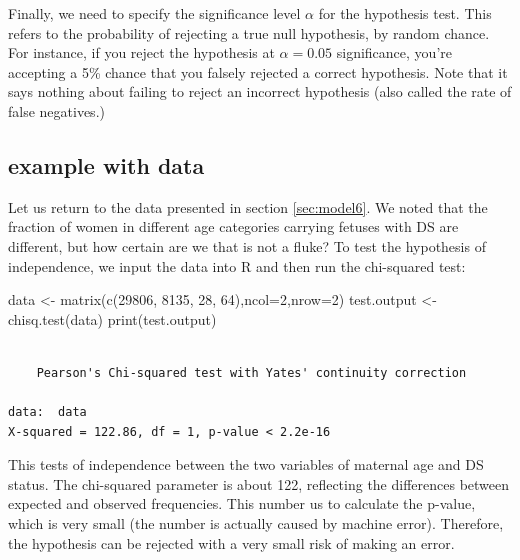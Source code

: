 \documentclass[
  letterpaper,
  DIV=11,
  numbers=noendperiod]{scrreprt}
\newenvironment{Shaded}{\begin{snugshade}}{\end{snugshade}}
\newcommand{\AttributeTok}[1]{\textcolor[rgb]{0.40,0.45,0.13}{#1}}
\newcommand{\DecValTok}[1]{\textcolor[rgb]{0.68,0.00,0.00}{#1}}
\newcommand{\FunctionTok}[1]{\textcolor[rgb]{0.28,0.35,0.67}{#1}}
\newcommand{\NormalTok}[1]{\textcolor[rgb]{0.00,0.23,0.31}{#1}}
\newcommand{\OtherTok}[1]{\textcolor[rgb]{0.00,0.23,0.31}{#1}}
\begin{document}
Finally, we need to specify the significance level \(\alpha\) for the
hypothesis test. This refers to the probability of rejecting a true null
hypothesis, by random chance. For instance, if you reject the hypothesis
at \(\alpha=0.05\) significance, you're accepting a 5\% chance that you
falsely rejected a correct hypothesis. Note that it says nothing about
failing to reject an incorrect hypothesis (also called the rate of false
negatives.)

\hypertarget{example-with-data}{%
\subsection{example with data}\label{example-with-data}}

Let us return to the data presented in section \ref{sec:model6}. We
noted that the fraction of women in different age categories carrying
fetuses with DS are different, but how certain are we that is not a
fluke? To test the hypothesis of independence, we input the data into R
and then run the chi-squared test:

\begin{Shaded}
\begin{Highlighting}[]
\NormalTok{data }\OtherTok{\textless{}{-}} \FunctionTok{matrix}\NormalTok{(}\FunctionTok{c}\NormalTok{(}\DecValTok{29806}\NormalTok{, }\DecValTok{8135}\NormalTok{, }\DecValTok{28}\NormalTok{, }\DecValTok{64}\NormalTok{),}\AttributeTok{ncol=}\DecValTok{2}\NormalTok{,}\AttributeTok{nrow=}\DecValTok{2}\NormalTok{)}
\NormalTok{test.output }\OtherTok{\textless{}{-}} \FunctionTok{chisq.test}\NormalTok{(data)}
\FunctionTok{print}\NormalTok{(test.output)}
\end{Highlighting}
\end{Shaded}

\begin{verbatim}

    Pearson's Chi-squared test with Yates' continuity correction

data:  data
X-squared = 122.86, df = 1, p-value < 2.2e-16
\end{verbatim}

This tests of independence between the two variables of maternal age and
DS status. The chi-squared parameter is about 122, reflecting the
differences between expected and observed frequencies. This number us to
calculate the p-value, which is very small (the number is actually
caused by machine error). Therefore, the hypothesis can be rejected with
a very small risk of making an error.
\end{document}
